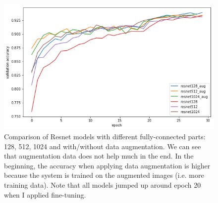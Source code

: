 \begin{figure}[tb]
	\centering
	\includegraphics[width=0.8\hsize]{./figures/compareResnet}
	\caption{Comparison of Resnet models with different fully-connected parts: 128, 512, 1024 and with/without data augmentation. We can see that augmentation data does not help much in the end. In the beginning, the accuracy when applying data augmentation is higher because the system is trained on the augmented images (i.e. more training data). Note that all models jumped up around epoch 20 when I applied fine-tuning.}
	\label{fig:compareResnet}
\end{figure}


